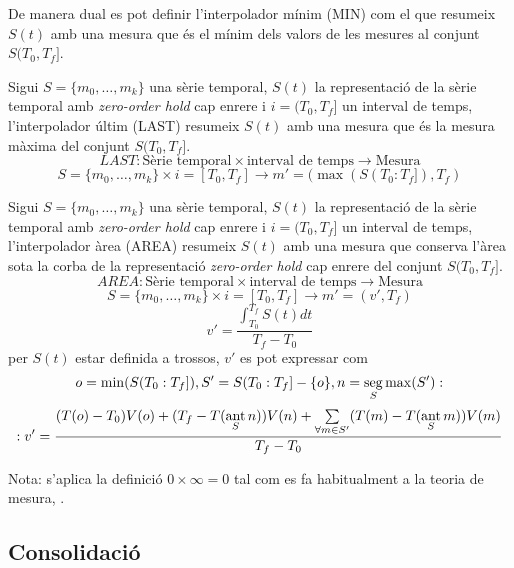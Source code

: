 De manera dual es pot definir l'interpolador mínim (MIN) com el
que resumeix $S(t)$ amb una mesura que és el mínim dels valors de les
mesures al conjunt $S(T_0,T_f]$.


\begin{definition}
  Sigui $S=\{m_0,\ldots,m_k\}$ una sèrie temporal, $S(t)$ la
  representació de la sèrie temporal amb \emph{zero-order hold} cap
  enrere i $i=(T_0,T_f]$ un interval de temps, l'interpolador últim
  (LAST) resumeix $S(t)$ amb una mesura que és la mesura màxima del
  conjunt $S(T_0,T_f]$.
\[
LAST: \text{Sèrie temporal} \times \text{interval de temps} \longrightarrow \text{Mesura}
\]
\[
S=\{m_0,\ldots,m_k\} \times i=[T_0,T_f]  \longrightarrow m'=(\max(S(T_0:T_f]),T_f)
\]
\end{definition}



\begin{definition}
  Sigui $S=\{m_0,\ldots,m_k\}$ una sèrie temporal, $S(t)$ la
  representació de la sèrie temporal amb \emph{zero-order hold} cap
  enrere i $i=(T_0,T_f]$ un interval de temps, l'interpolador àrea
  (AREA) resumeix $S(t)$ amb una mesura que conserva l'àrea sota la
  corba de la representació \emph{zero-order hold} cap enrere del
  conjunt $S(T_0,T_f]$.
\[
AREA: \text{Sèrie temporal} \times \text{interval de temps} \longrightarrow \text{Mesura}
\]
\[
S=\{m_0,\ldots,m_k\} \times i=[T_0,T_f]  \longrightarrow m'=(v',T_f)
\]
\[
v' = 
\frac{\int_{T_0}^{T_f} S(t) dt}{T_f - T_0}
\]
per $S(t)$ estar definida a trossos, $v'$ es pot expressar com
\[
o=\min(S(T_0:T_f]),
S'= S(T_0:T_f] - \{o\},
n=\seg\limits_S \max(S'): %
\]
\[
:v'= \frac{(T(o)-T_0)V(o) 
+( T_f- T(\operatorname*{ant}\limits_S n) )V(n) 
+\sum\limits_{\forall m \in S'}( T(m)- T(\operatorname*{ant}\limits_S m) )V(m)}
{T_f-T_0} 
\]

Nota: s'aplica la definició $0 \times \infty = 0$ tal com es fa habitualment a la teoria de mesura, \cite{wiki:extendedreal}.
\end{definition}




\subsection{Consolidació}

